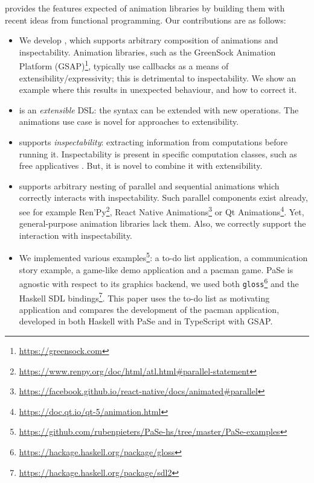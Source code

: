 \dsl{} provides the features expected of animation libraries by building them with recent ideas from functional programming. Our contributions are as follows:
\begin{itemize}
\item We develop \dsl{}, which supports arbitrary composition of animations and inspectability. Animation libraries, such as the GreenSock Animation Platform (GSAP)\footnote{\url{https://greensock.com}}, typically use callbacks as a means of extensibility/expressivity; this is detrimental to inspectability. We show an example where this results in unexpected behaviour, and how to correct it.
\item \dsl{} is an \emph{extensible} DSL: the syntax can be extended with new operations. The animations use case is novel for approaches to extensibility.
\item \dsl{} supports \emph{inspectability}: extracting information from computations before running it. Inspectability is present in specific computation classes, such as free applicatives \cite{DBLP:journals/corr/CapriottiK14}. But, it is novel to combine it with extensibility.
\item \dsl{} supports arbitrary nesting of parallel and sequential animations which correctly interacts with inspectability. Such parallel components exist already, see for example Ren'Py\footnote{\url{https://www.renpy.org/doc/html/atl.html\#parallel-statement}}, React Native Animations\footnote{\url{https://facebook.github.io/react-native/docs/animated\#parallel}} or Qt Animations\footnote{\url{https://doc.qt.io/qt-5/animation.html}}. Yet, general-purpose animation libraries lack them. Also, we correctly support the interaction with inspectability.
\item We implemented various examples\footnote{\url{https://github.com/rubenpieters/PaSe-hs/tree/master/PaSe-examples}}: a to-do list application, a communication story example, a game-like demo application and a pacman game. PaSe is agnostic with respect to its graphics backend, we used both \texttt{gloss}\footnote{\url{https://hackage.haskell.org/package/gloss}} and the Haskell SDL bindings\footnote{\url{https://hackage.haskell.org/package/sdl2}}. This paper uses the to-do list as motivating application and compares the development of the pacman application, developed in both Haskell with PaSe and in TypeScript with GSAP.
\end{itemize}
